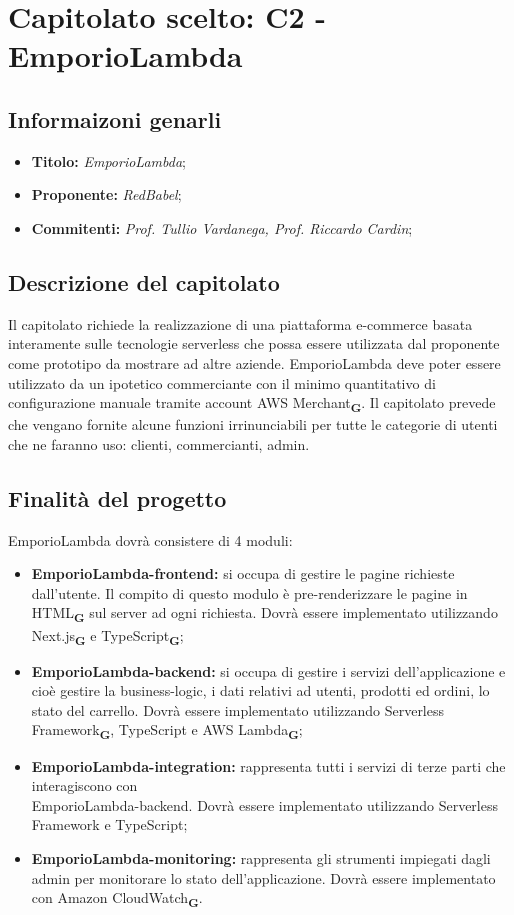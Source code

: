 \section{Capitolato scelto: C2 -  	EmporioLambda}
\subsection{Informaizoni genarli}
\begin{itemize}
    \item \textbf{Titolo:} \textit{EmporioLambda};
    \item \textbf{Proponente:} \textit{RedBabel};
    \item \textbf{Commitenti:} \textit{Prof. Tullio Vardanega, Prof. Riccardo Cardin};
\end{itemize}
\subsection{Descrizione del capitolato}
Il capitolato richiede la realizzazione di una piattaforma e-commerce
basata interamente sulle tecnologie serverless che possa essere utilizzata
dal proponente come prototipo da mostrare ad altre aziende. EmporioLambda
deve poter essere utilizzato da un ipotetico commerciante con il minimo
quantitativo di configurazione manuale tramite account AWS Merchant\textsubscript{\textbf{G}}.
Il capitolato prevede che vengano fornite alcune funzioni irrinunciabili
per tutte le categorie di utenti che ne faranno uso: clienti, commercianti, admin.
\subsection{Finalità del progetto}
EmporioLambda dovrà consistere di 4 moduli:
\begin{itemize}
    \item \textbf{EmporioLambda-frontend:} si occupa di gestire le pagine richieste dall’utente. Il compito di questo modulo è pre-renderizzare le pagine in HTML\textsubscript{\textbf{G}} sul server ad ogni richiesta. Dovrà essere implementato utilizzando Next.js\textsubscript{\textbf{G}} e TypeScript\textsubscript{\textbf{G}};
    \item \textbf{EmporioLambda-backend:} si occupa di gestire i servizi dell’applicazione e cioè gestire la business-logic, i dati relativi ad utenti, prodotti ed ordini, lo stato del carrello. Dovrà essere implementato utilizzando Serverless Framework\textsubscript{\textbf{G}}, TypeScript e AWS Lambda\textsubscript{\textbf{G}};
    \item \textbf{EmporioLambda-integration:} rappresenta tutti i servizi di terze parti che interagiscono con \\EmporioLambda-backend. Dovrà essere implementato utilizzando Serverless Framework e TypeScript;
    \item \textbf{EmporioLambda-monitoring:} rappresenta gli strumenti impiegati dagli admin per monitorare lo stato dell’applicazione. Dovrà essere implementato con Amazon CloudWatch\textsubscript{\textbf{G}}.
\end{itemize}
